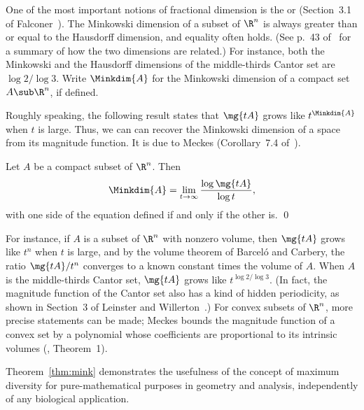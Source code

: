 One of the most important notions of fractional dimension is the
%
%
%
%
or  (Section~3.1 of Falconer~\cite{Falc}).  The Minkowski dimension
of a subset of $\R^n$ is always greater than or equal to the Hausdorff
dimension, and equality often holds.  (See p.~43 of~\cite{Falc} for
a summary of how the two dimensions are related.)  For instance, both the
Minkowski and the Hausdorff dimensions of the middle-thirds Cantor set are
$\log 2/\log 3$.
Write $\Minkdim{A}$ for the
Minkowski dimension of a compact set $A \sub \R^n$, if defined.

Roughly speaking, the following result states that $\mg{tA}$ grows like
$t^{\Minkdim{A}}$ when $t$ is large.  Thus, we can can recover the
Minkowski dimension of a space from its magnitude function.  It is due to
Meckes (Corollary~7.4 of~\cite{MeckMDC}).

\begin{thm}[Meckes]
%
% 
Let $A$ be a compact subset of $\R^n$.  Then
\[
\Minkdim{A}
=
\lim_{t \to \infty} \frac{\log \mg{tA}}{\log t},
\]
with one side of the equation defined if and only if the other is.
\qed
\end{thm}

For instance, if $A$ is a subset of $\R^n$ with nonzero volume, then
$\mg{tA}$ grows like $t^n$ when $t$ is large, and by the volume theorem of
Barcel\'o and Carbery, the ratio $\mg{tA}/t^n$ converges to a known
constant times the volume of $A$.  When $A$ is the middle-thirds
Cantor%
%
% 
set, $\mg{tA}$ grows like $t^{\log 2/\log 3}$.  (In fact, the magnitude
function of the Cantor set also has a kind of hidden periodicity, as shown
in Section~3 of Leinster and Willerton~\cite{AMSES}.)  For convex subsets
of $\R^n$, more precise statements can be made; Meckes%
%
% 
bounds the magnitude function of a convex set by a polynomial whose
coefficients are proportional to its intrinsic volumes (\cite{MeckMIV},
Theorem~1). 

Theorem~\ref{thm:mink} demonstrates the usefulness of the concept of
maximum%
% 
% 
diversity for pure-mathematical purposes in geometry and analysis,
independently of any biological application.

